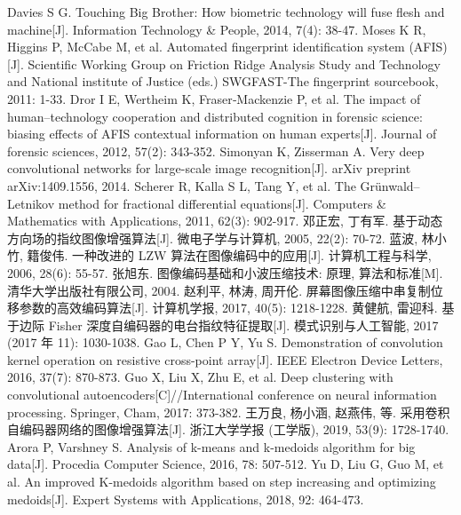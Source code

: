 \documentclass{whutmod}
\begin{document}
 
	\newpage	%
	\nocite{*}		%
	\begin{thebibliography}{9}%
		Davies S G. Touching Big Brother: How biometric technology will fuse flesh and machine[J]. Information Technology \& People, 2014, 7(4): 38-47.
	Moses K R, Higgins P, McCabe M, et al. Automated fingerprint identification system (AFIS)[J]. Scientific Working Group on Friction Ridge Analysis Study and Technology and National institute of Justice (eds.) SWGFAST-The fingerprint sourcebook, 2011: 1-33.
	Dror I E, Wertheim K, Fraser‐Mackenzie P, et al. The impact of human–technology cooperation and distributed cognition in forensic science: biasing effects of AFIS contextual information on human experts[J]. Journal of forensic sciences, 2012, 57(2): 343-352.
	Simonyan K, Zisserman A. Very deep convolutional networks for large-scale image recognition[J]. arXiv preprint arXiv:1409.1556, 2014.
	Scherer R, Kalla S L, Tang Y, et al. The Grünwald–Letnikov method for fractional differential equations[J]. Computers \& Mathematics with Applications, 2011, 62(3): 902-917.
	邓正宏, 丁有军. 基于动态方向场的指纹图像增强算法[J]. 微电子学与计算机, 2005, 22(2): 70-72.
	蓝波, 林小竹, 籍俊伟. 一种改进的 LZW 算法在图像编码中的应用[J]. 计算机工程与科学, 2006, 28(6): 55-57.
	张旭东. 图像编码基础和小波压缩技术: 原理, 算法和标准[M]. 清华大学出版社有限公司, 2004.
	赵利平, 林涛, 周开伦. 屏幕图像压缩中串复制位移参数的高效编码算法[J]. 计算机学报, 2017, 40(5): 1218-1228.
	黄健航, 雷迎科. 基于边际 Fisher 深度自编码器的电台指纹特征提取[J]. 模式识别与人工智能, 2017 (2017 年 11): 1030-1038.
	Gao L, Chen P Y, Yu S. Demonstration of convolution kernel operation on resistive cross-point array[J]. IEEE Electron Device Letters, 2016, 37(7): 870-873.
	Guo X, Liu X, Zhu E, et al. Deep clustering with convolutional autoencoders[C]//International conference on neural information processing. Springer, Cham, 2017: 373-382.
	 王万良, 杨小涵, 赵燕伟, 等. 采用卷积自编码器网络的图像增强算法[J]. 浙江大学学报 (工学版), 2019, 53(9): 1728-1740.
	Arora P, Varshney S. Analysis of k-means and k-medoids algorithm for big data[J]. Procedia Computer Science, 2016, 78: 507-512.
	Yu D, Liu G, Guo M, et al. An improved K-medoids algorithm based on step increasing and optimizing medoids[J]. Expert Systems with Applications, 2018, 92: 464-473.
	\end{thebibliography}
\end{document}
